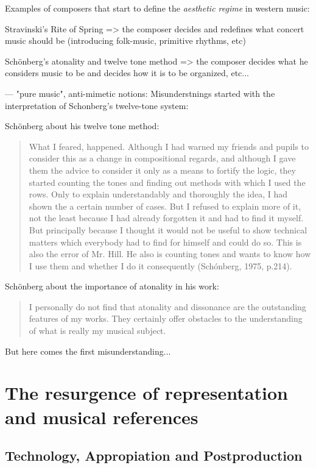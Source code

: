 Examples of composers that start to define the \emph{aesthetic regime} in western music:

Stravinski's Rite of Spring => the composer decides and redefines what concert music should be (introducing folk-music, primitive rhythms, etc)

Sch\"{o}nberg's atonality and twelve tone method => the composer decides what he considers music to be and decides how it is to be organized, etc...

---
"pure music", anti-mimetic notions: Misunderstnings started with the interpretation of Schonberg's twelve-tone system: 

Sch\"{o}nberg about his twelve tone method:

\begin{quote}
What I feared, happened. Although I had warned my friends and pupils to consider this as a change in compositional regards, and although I gave them the advice to consider it only as a means to fortify the logic, they started counting the tones and finding out methods with which I used the rows. Only to explain understandably and thoroughly the idea, I had shown the a certain number of cases. But I refused to explain more of it, not the least because I had already forgotten it and had to find it myself. But principally because I thought it would not be useful to show technical matters which everybody had to find for himself and could do so. This is also the error of Mr. Hill. He also is counting tones and wants to know how I use them and whether I do it consequently (Sch\'{o}nberg, 1975, p.214). 
\end{quote}

Sch\"{o}nberg about the importance of atonality in his work:

\begin{quote}
I personally do not find that atonality and dissonance are the outstanding features of my works. They certainly offer obstacles to the understanding of what is really my musical subject.
\end{quote}

But here comes the first misunderstanding... 


\section{The resurgence of representation and musical references}

\subsection{Technology, Appropiation and Postproduction} 

